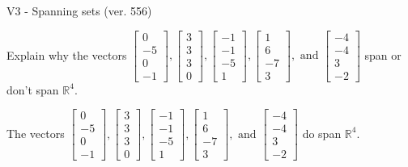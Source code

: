 \begin{exercise}
  \begin{exerciseTitle}V3 - Spanning sets (ver. 556)\end{exerciseTitle}
  \begin{exerciseStatement}
    Explain why the vectors \(\left[\begin{array}{r}
0 \\
-5 \\
0 \\
-1
\end{array}\right] , \left[\begin{array}{r}
3 \\
3 \\
3 \\
0
\end{array}\right] , \left[\begin{array}{r}
-1 \\
-1 \\
-5 \\
1
\end{array}\right] , \left[\begin{array}{r}
1 \\
6 \\
-7 \\
3
\end{array}\right] , \text{ and } \left[\begin{array}{r}
-4 \\
-4 \\
3 \\
-2
\end{array}\right]\) span or don't span \(\mathbb{R}^4\). 
	


  \end{exerciseStatement}
  \begin{exerciseAnswer}
   The vectors \(\left[\begin{array}{r}
0 \\
-5 \\
0 \\
-1
\end{array}\right] , \left[\begin{array}{r}
3 \\
3 \\
3 \\
0
\end{array}\right] , \left[\begin{array}{r}
-1 \\
-1 \\
-5 \\
1
\end{array}\right] , \left[\begin{array}{r}
1 \\
6 \\
-7 \\
3
\end{array}\right] , \text{ and } \left[\begin{array}{r}
-4 \\
-4 \\
3 \\
-2
\end{array}\right]\) 
  	 do  
	span \(\mathbb{R}^4\).
  



\end{exerciseAnswer}
\end{exercise}
